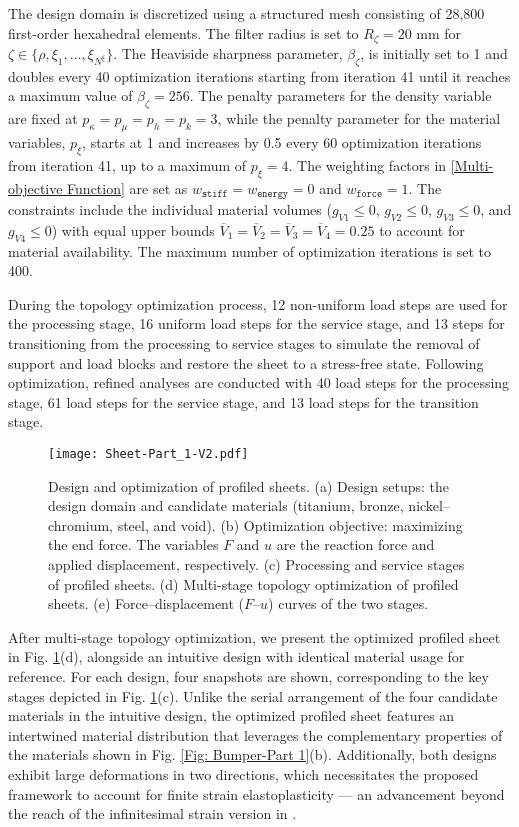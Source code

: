 \documentclass[preprint,11pt]{elsarticle}
\theoremstyle{definition}
\begin{document}
The design domain is discretized using a structured mesh consisting of 28,800 first-order hexahedral elements. The filter radius is set to $R_\zeta = 20$ mm for $\zeta \in \{\rho, \xi_1, \ldots, \xi_{N^\xi} \}$. The Heaviside sharpness parameter, $\beta_\zeta$, is initially set to 1 and doubles every 40 optimization iterations starting from iteration 41 until it reaches a maximum value of $\beta_\zeta = 256$. The penalty parameters for the density variable are fixed at $p_\kappa = p_\mu = p_h = p_k = 3$, while the penalty parameter for the material variables, $p_\xi$, starts at 1 and increases by 0.5 every 60 optimization iterations from iteration 41, up to a maximum of $p_\xi = 4$. The weighting factors in \eqref{Multi-objective Function} are set as $w_\texttt{stiff} = w_\texttt{energy} = 0$ and $w_\texttt{force} = 1$. The constraints include the individual material volumes ($g_{V1} \leq 0$, $g_{V2} \leq 0$, $g_{V3} \leq 0$, and $g_{V4} \leq 0$) with equal upper bounds $\overline{V}_1 = \overline{V}_2 = \overline{V}_3 = \overline{V}_4 = 0.25$ to account for material availability. The maximum number of optimization iterations is set to 400.

During the topology optimization process, 12 non-uniform load steps are used for the processing stage, 16 uniform load steps for the service stage, and 13 steps for transitioning from the processing to service stages to simulate the removal of support and load blocks and restore the sheet to a stress-free state. Following optimization, refined analyses are conducted with 40 load steps for the processing stage, 61 load steps for the service stage, and 13 load steps for the transition stage.

\begin{figure}[!htbp]
    \centering
    \texttt{[image: Sheet-Part\_1-V2.pdf]}
    \caption{Design and optimization of profiled sheets. (a) Design setups: the design domain and candidate materials (titanium, bronze, nickel--chromium, steel, and void). (b) Optimization objective: maximizing the end force. The variables $F$ and $u$ are the reaction force and applied displacement, respectively. (c) Processing and service stages of profiled sheets. (d) Multi-stage topology optimization of profiled sheets. (e) Force--displacement ($F$--$u$) curves of the two stages.}
    \label{Fig: Sheet-Part 1}
\end{figure}

After multi-stage topology optimization, we present the optimized profiled sheet in Fig. \ref{Fig: Sheet-Part 1}(d), alongside an intuitive design with identical material usage for reference. For each design, four snapshots are shown, corresponding to the key stages depicted in Fig. \ref{Fig: Sheet-Part 1}(c). Unlike the serial arrangement of the four candidate materials in the intuitive design, the optimized profiled sheet features an intertwined material distribution that leverages the complementary properties of the materials shown in Fig. \ref{Fig: Bumper-Part 1}(b). Additionally, both designs exhibit large deformations in two directions, which necessitates the proposed framework to account for finite strain elastoplasticity --- an advancement beyond the reach of the infinitesimal strain version in \citet{jia_multimaterial_2025}.
\end{document}
